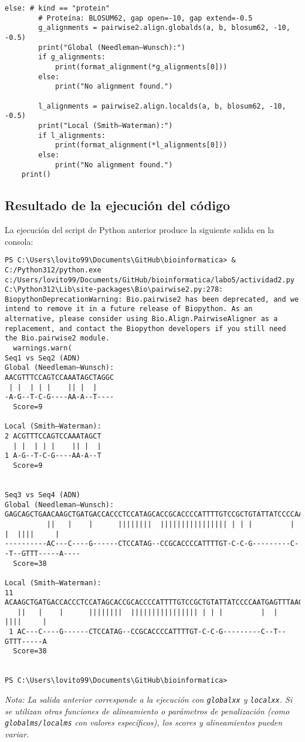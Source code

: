 \documentclass[fleqn,10pt]{article}
\begin{document}
\begin{lstlisting}[style=pythonstyle, caption={Código Python para alineamiento de secuencias con BioPython}, label={lst:biopython_code}]
    else: # kind == "protein"
        # Proteína: BLOSUM62, gap open=-10, gap extend=-0.5
        g_alignments = pairwise2.align.globalds(a, b, blosum62, -10, -0.5)
        print("Global (Needleman–Wunsch):")
        if g_alignments:
            print(format_alignment(*g_alignments[0]))
        else:
            print("No alignment found.")
            
        l_alignments = pairwise2.align.localds(a, b, blosum62, -10, -0.5)
        print("Local (Smith–Waterman):")
        if l_alignments:
            print(format_alignment(*l_alignments[0]))
        else:
            print("No alignment found.")
    print()
\end{lstlisting}

\subsection*{Resultado de la ejecución del código}
La ejecución del script de Python anterior produce la siguiente salida en la consola:

\begin{lstlisting}[style=outputstyle, caption={Salida de la consola al ejecutar el script de Python (ejemplo con globalxx/localxx)}, label={lst:biopython_output}]
PS C:\Users\lovito99\Documents\GitHub\bioinformatica> & C:/Python312/python.exe c:/Users/lovito99/Documents/GitHub/bioinformatica/labo5/actividad2.py
C:\Python312\Lib\site-packages\Bio\pairwise2.py:278: BiopythonDeprecationWarning: Bio.pairwise2 has been deprecated, and we intend to remove it in a future release of Biopython. As an alternative, please consider using Bio.Align.PairwiseAligner as a replacement, and contact the Biopython developers if you still need the Bio.pairwise2 module.
  warnings.warn(
Seq1 vs Seq2 (ADN)
Global (Needleman–Wunsch):
AACGTTTCCAGTCCAAATAGCTAGGC
 | |  | | |    || |  |
-A-G--T-C-G----AA-A--T----
  Score=9

Local (Smith–Waterman):
2 ACGTTTCCAGTCCAAATAGCT
  | |  | | |    || |  |
1 A-G--T-C-G----AA-A--T
  Score=9


Seq3 vs Seq4 (ADN)
Global (Needleman–Wunsch):
GAGCAGCTGAACAAGCTGATGACCACCCTCCATAGCACCGCACCCCATTTTGTCCGCTGTATTATCCCCAATGAGTTTAAGCAATCGG
          ||   |    |      ||||||||  |||||||||||||||| | | |         |  |  ||||     |
----------AC---C----G------CTCCATAG--CCGCACCCCATTTTGT-C-C-G---------C--T--GTTT-----A----
  Score=38

Local (Smith–Waterman):
11 ACAAGCTGATGACCACCCTCCATAGCACCGCACCCCATTTTGTCCGCTGTATTATCCCCAATGAGTTTAAGCAA
   ||   |    |      ||||||||  |||||||||||||||| | | |         |  |  ||||     |
 1 AC---C----G------CTCCATAG--CCGCACCCCATTTTGT-C-C-G---------C--T--GTTT-----A
  Score=38


PS C:\Users\lovito99\Documents\GitHub\bioinformatica> 
\end{lstlisting}
\textit{Nota: La salida anterior corresponde a la ejecución con \texttt{globalxx} y \texttt{localxx}. Si se utilizan otras funciones de alineamiento o parámetros de penalización (como \texttt{globalms/localms} con valores específicos), los scores y alineamientos pueden variar.}
\end{document}
